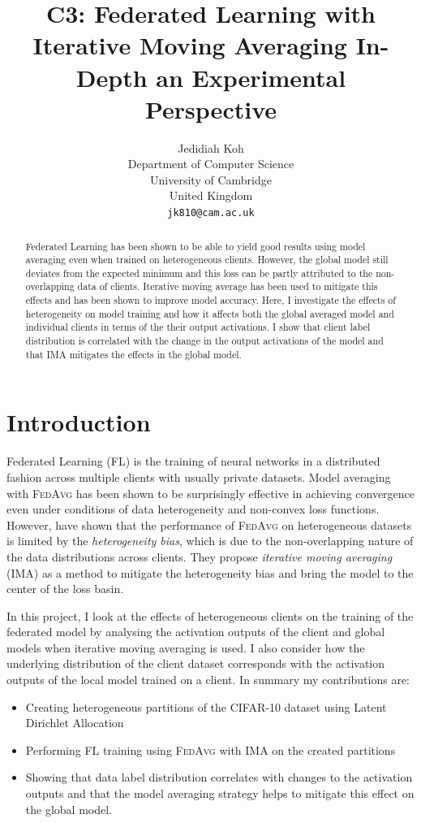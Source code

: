 \documentclass{article}
\title{C3: Federated Learning with Iterative Moving Averaging In-Depth an Experimental Perspective}
\author{%
  Jedidiah Koh \\
  Department of Computer Science\\
  University of Cambridge\\
  United Kingdom \\
  \texttt{jk810@cam.ac.uk} \\
}
\newcommand*{\fedavg}{\textsc{FedAvg}}
\begin{document}
\maketitle


\begin{abstract}
  Federated Learning has been shown to be able to yield good results using model averaging even when trained on heterogeneous clients. However, the global model still deviates from the expected minimum and this loss can be partly attributed to the non-overlapping data of clients. Iterative moving average has been used to mitigate this effects and has been shown to improve model accuracy. Here, I investigate the effects of heterogeneity on model training and how it affects both the global averaged model and individual clients in terms of the their output activations. I show that client label distribution is correlated with the change in the output activations of the model and that IMA mitigates the effects in the global model.
\end{abstract}

\section{Introduction}
Federated Learning (FL) is the training of neural networks in a distributed fashion across multiple clients with usually private datasets. Model averaging with \fedavg{} \cite{mcmahanCommunicationEfficientLearningDeep2017} has been shown to be surprisingly effective in achieving convergence even under conditions of data heterogeneity and non-convex loss functions. However, \citet{zhouUnderstandingImprovingModel2023} have shown that the performance of \fedavg{} on heterogeneous datasets is limited by the \emph{heterogeneity bias}, which is due to the non-overlapping nature of the data distributions across clients. They propose \emph{iterative moving averaging} (IMA) as a method to mitigate the heterogeneity bias and bring the model to the center of the loss basin.

In this project, I look at the effects of heterogeneous clients on the training of the federated model by analysing the activation outputs of the client and global models when iterative moving averaging is used. I also consider how the underlying distribution of the client dataset corresponds with the activation outputs of the local model trained on a client. In summary my contributions are:
\begin{itemize}
  \item Creating heterogeneous partitions of the CIFAR-10 dataset using Latent Dirichlet Allocation
  \item Performing FL training using \fedavg{} with IMA on the created partitions
  \item Showing that data label distribution correlates with changes to the activation outputs and that the model averaging strategy helps to mitigate this effect on the global model.
\end{itemize}
\end{document}
